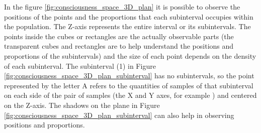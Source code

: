 In the figure \ref{fig:consciousness_space_3D_plan} it is possible to observe the positions of the points and the proportions that each subinterval occupies within the population. The Z-axis represents the entire interval or its subintervals. The points inside the cubes or rectangles are the actually observable parts (the transparent cubes and rectangles are to help understand the positions and proportions of the subintervals) and the size of each point depends on the density of each subinterval. The subinterval (1) in Figure \ref{fig:consciousness_space_3D_plan_subinterval} has no subintervals, so the point represented by the letter A refers to the quantities of samples of that subinterval on each side of the pair of samples (the X and Y axes, for example ) and centered on the Z-axis. The shadows on the plane in Figure \ref{fig:consciousness_space_3D_plan_subinterval} can also help in observing positions and proportions.

